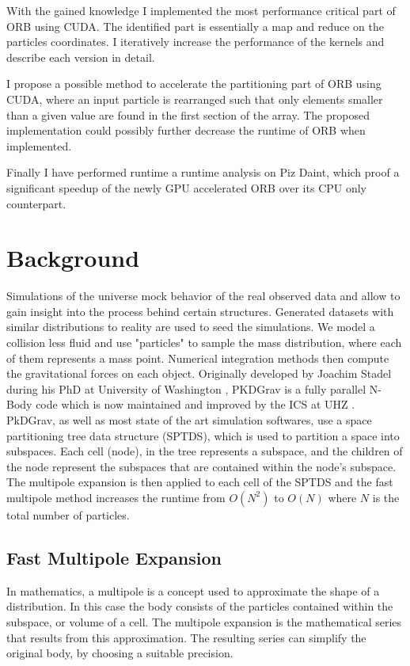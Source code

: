 \documentclass[]{article}
\begin{document}
With the gained knowledge I implemented the most performance critical part of ORB using CUDA. The identified part is essentially a map and reduce on the particles coordinates. I iteratively increase the performance of the kernels and describe each version in detail.

I propose a possible method to accelerate the partitioning part of ORB using CUDA, where an input particle is rearranged such that only elements smaller than a given value are found in the first section of the array. The proposed implementation could possibly further decrease the runtime of ORB when implemented.

Finally I have performed runtime a runtime analysis on Piz Daint, which proof a significant speedup of the newly GPU accelerated ORB over its CPU only counterpart.

\newpage
\section{Background}

Simulations of the universe mock behavior of the real observed data and allow to gain insight into the process behind certain structures\cite{Stadel2001}. Generated datasets with similar distributions to reality are used to seed the simulations. We model a collision less fluid and use "particles" to sample the mass distribution, where each of them represents a mass point. Numerical integration methods then compute the gravitational forces on each object.
Originally developed by Joachim Stadel during his PhD at University of Washington \cite{Stadel2001}, PKDGrav is a fully parallel N-Body code which is now maintained and improved by the ICS at UHZ \cite{ICS}. 
PkDGrav, as well as most state of the art simulation softwares, use a space partitioning tree data structure (SPTDS), which is used to partition a space into subspaces. Each cell (node), in the tree represents a subspace, and the children of the node represent the subspaces that are contained within the node's subspace. The multipole expansion is then applied to each cell of the SPTDS and the fast multipole method increases the runtime from $O(N^2)$ to $O(N)$ where $N$ is the total number of particles. \cite{Stadel2001}


\subsection{Fast Multipole Expansion} \label{sec:multipole}

In mathematics, a multipole is a concept used to approximate the shape of a distribution. In this case the body consists of the particles contained within the subspace, or volume of a cell. The multipole expansion is the mathematical series that results from this approximation. The resulting series can simplify the original body, by choosing a suitable precision.
\end{document}
